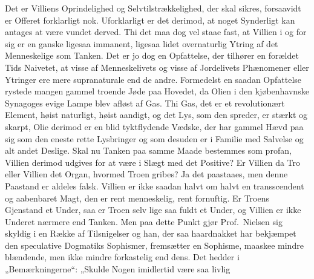 Det er Villiens Oprindelighed og Selvtilstrækkelighed, der skal sikres,
forsaavidt er Offeret forklarligt nok. Uforklarligt er det derimod, at noget
Synderligt kan antages at være vundet derved. Thi det maa dog vel staae fast,
at Villien i og for sig er en
ganske ligesaa immanent, ligesaa lidet overnaturlig Ytring af det
Menneskelige som Tanken. Det er jo dog en Opfattelse, der tilhører en forældet
Tids Naivetet, at visse af Menneskelivets og visse af Jordelivets Phænomener
eller Ytringer ere mere supranaturale end de andre. Formedelst en saadan
Opfattelse rystede mangen gammel troende Jøde paa Hovedet, da Olien i den
kjøbenhavnske Synagoges evige Lampe blev afløst af Gas. Thi Gas, det er et
revolutionært Element, høist naturligt, høist aandigt, og det Lys, som den
spreder, er stærkt og skarpt, Olie derimod er en blid tyktflydende Vædske, der
har gammel Hævd paa sig som den eneste rette Lysbringer og som desuden er i
Familie med Salvelse og alt andet Deslige. Skal nu Tanken paa samme Maade
bestemmes som profan, Villien derimod udgives for at være i Slægt med det
Positive? Er Villien da Tro eller Villien det Organ, hvormed Troen gribes? Ja
det paastaaes, men denne Paastand er aldeles falsk. Villien er ikke saadan
halvt om halvt en transscendent og aabenbaret Magt, den er rent menneskelig,
rent fornuftig. Er Troens Gjenstand et Under, saa er Troen selv lige saa fuldt
et Under, og Villien er ikke
Underet nærmere end Tanken. Men paa dette Punkt gjør Prof.\ Nielsen sig
skyldig i en Række af Tilsnigelser og han, der saa haardnakket har bekjæmpet
den speculative Dogmatiks Sophismer, fremsætter en
Sophisme, maaskee mindre blændende, men ikke mindre forkastelig end
dens. Det hedder i „Bemærkningerne“: „Skulde Nogen imidlertid være saa livlig
